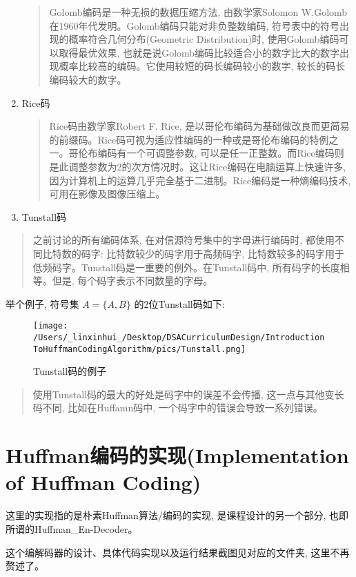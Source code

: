 \documentclass{article}
\begin{document}
\begin{CJK}{UTF8}{gbsn}
\begin{enumerate}
  \begin{quote}
  Golomb编码是一种无损的数据压缩方法, 由数学家Solomon W.Golomb在1960年代发明。Golomb编码只能对非负整数编码, 符号表中的符号出现的概率符合几何分布(Geometric Distribution)时, 使用Golomb编码可以取得最优效果, 也就是说Golomb编码比较适合小的数字比大的数字出现概率比较高的编码。它使用较短的码长编码较小的数字, 较长的码长编码较大的数字。
  \end{quote}
\item
  Rice码

\begin{quote}
Rice码由数学家Robert F. Rice, 是以哥伦布编码为基础做改良而更简易的前缀码。Rice码可视为适应性编码的一种或是哥伦布编码的特例之一。哥伦布编码有一个可调整参数, 可以是任一正整数。而Rice编码则是此调整参数为2的次方情况时。这让Rice编码在电脑运算上快速许多,  因为计算机上的运算几乎完全基于二进制。Rice编码是一种熵编码技术, 可用在影像及图像压缩上。
\end{quote}
\item
Tunstall码
\end{enumerate}

\begin{quote}
之前讨论的所有编码体系, 在对信源符号集中的字母进行编码时, 都使用不同比特数的码字: 比特数较少的码字用于高频码字, 比特数较多的码字用于低频码字。Tunstall码是一重要的例外。在Tunstall码中, 所有码字的长度相等。但是, 每个码字表示不同数量的字母。
\end{quote}

举个例子, 符号集 \(A = \{A, B\}\) 的2位Tunstall码如下:

\begin{figure}[H]
\centering
\texttt{[image: /Users/\_linxinhui\_/Desktop/DSACurriculumDesign/IntroductionToHuffmanCodingAlgorithm/pics/Tunstall.png]}
\caption{Tunstall码的例子}
\end{figure}

\begin{quote}
使用Tunstall码的最大的好处是码字中的误差不会传播, 这一点与其他变长码不同, 比如在Huffamn码中, 一个码字中的错误会导致一系列错误。
\end{quote}

\section{Huffman编码的实现(Implementation of Huffman Coding)}\label{header-n595}

这里的实现指的是朴素Huffman算法/编码的实现, 是课程设计的另一个部分, 也即所谓的Huffman\_En-Decoder。

这个编解码器的设计、具体代码实现以及运行结果截图见对应的文件夹, 这里不再赘述了。

\end{CJK}
\end{document}
